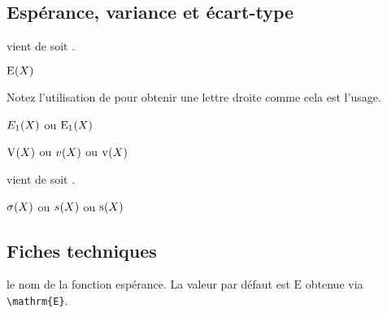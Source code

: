 \documentclass[12pt,a4paper]{article}
\begin{document}

\subsection{Espérance, variance et écart-type}


 vient de   soit .
\begin{latexex}
$\expval{X}$
\end{latexex}





Notez l'utilisation de  pour obtenir une lettre droite comme cela est l'usage.

\begin{latexex}
$\expval[E_1]{X}$ ou
$\expval[\mathrm{E}_1]{X}$
\end{latexex}





\begin{latexex}
$\var   {X}$ ou
$\var[v]{X}$ ou
$\var[\mathrm{v}]{X}$
\end{latexex}





 vient de   soit .

\begin{latexex}
$\stddev   {X}$ ou
$\stddev[s]{X}$ ou
$\stddev[\mathrm{s}]{X}$
\end{latexex}




\subsection{Fiches techniques}


\IDoption{} le nom de la fonction espérance. La valeur par défaut est $\mathrm{E}$ obtenue via \verb#\mathrm{E}#.
\end{document}
